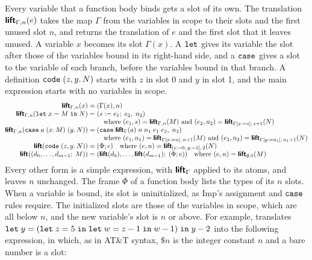 Every variable that a function body binds gets a slot of its own. The
translation $\textsf{\bfseries lift}_{\Gamma,n}(e)$ takes the map $\Gamma$ from the
variables in scope to their slots and the first unused slot $n$, and
returns the translation of $e$ and the first slot that it leaves
unused. A variable $x$ becomes its slot $\Gamma(x)$. A $\mathtt{let}$ gives
its variable the slot after those of the variables bound in its
right-hand side, and a $\mathtt{case}$ gives a slot to the variable of each
branch, before the variables bound in that branch. A definition
$\mathtt{code}\;(z, y.\,N)$ starts with $z$ in slot 0 and $y$ in slot 1,
and the main expression starts with no variables in scope.
\[
\begin{array}{@{}r@{\;}c@{\;}l@{}}
  \pass{lift}_{\Gamma,n}(x) & = & (\Gamma(x), n)\\
  \pass{lift}_{\Gamma,n}(\kw{let}\;x = M\;\kw{in}\;N) & = &
    (s \mathrel{:=} e_1;\; e_2,\; n_2)\\
  & & \quad \text{where } (e_1, s) = \pass{lift}_{\Gamma,n}(M)
    \text{ and } (e_2, n_2) = \pass{lift}_{\Gamma[x{:=}s],\, s+1}(N)\\
  \pass{lift}_{\Gamma,n}(\kw{case}\;a\;(x.\,M)\;(y.\,N)) & = &
    (\kw{case}\;\pass{lift}_\Gamma(a)\;n\;n_1\;e_1\;e_2,\; n_2)\\
  & & \quad \text{where } (e_1, n_1) = \pass{lift}_{\Gamma[x{:=}n],\, n+1}(M)
    \text{ and } (e_2, n_2) = \pass{lift}_{\Gamma[y{:=}n_1],\, n_1+1}(N)\\
  \pass{lift}(\kw{code}\;(z, y.\,N)) & = & (\Phi; e)
    \quad \text{where } (e, n) = \pass{lift}_{[z{:=}0,\, y{:=}1],\, 2}(N)\\
  \pass{lift}((d_0, \ldots, d_{m-1};\; M)) & = &
    (\pass{lift}(d_0), \ldots, \pass{lift}(d_{m-1});\; (\Phi; e))
    \quad \text{where } (e, n) = \pass{lift}_{\emptyset,0}(M)
\end{array}
\]
Every other form is a simple expression, with $\textsf{\bfseries lift}_\Gamma$
applied to its atoms, and leaves $n$ unchanged. The frame $\Phi$ of a
function body lists the types of its $n$ slots. When a variable is
bound, its slot is uninitialized, as Imp's assignment and $\mathtt{case}$
rules require. The initialized slots are those of the variables in
scope, which are all below $n$, and the new variable's slot is $n$ or
above. For example,  translates
$\mathtt{let}\;y = (\mathtt{let}\;z = 5\;\mathtt{in}\;\mathtt{let}\;w = z - 1\;\mathtt{in}\;w - 1)\;\mathtt{in}\;y - 2$
into the following expression, in which, as in AT\&T syntax,
$\$n$ is the integer constant $n$ and a bare number is a slot:
